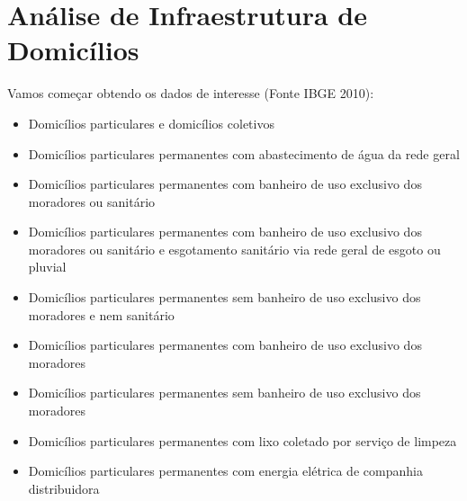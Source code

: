 \documentclass[letterpaper,10pt,brazil]{sphinxmanual}
\begin{document}
\sphinxstepscope


\section{Análise de Infraestrutura de Domicílios}
\label{\detokenize{exemplos/analise_domicilios:An_xe1lise-de-Infraestrutura-de-Domic_xedlios}}\label{\detokenize{exemplos/analise_domicilios::doc}}
\sphinxAtStartPar
Vamos começar obtendo os dados de interesse (Fonte IBGE 2010):
\begin{itemize}
\item {} 
 Domicílios particulares e domicílios coletivos

\item {} 
 Domicílios particulares permanentes com abastecimento de água da rede geral

\item {} 
 Domicílios particulares permanentes com banheiro de uso exclusivo dos moradores ou sanitário

\item {} 
 Domicílios particulares permanentes com banheiro de uso exclusivo dos moradores ou sanitário e esgotamento sanitário via rede geral de esgoto ou pluvial

\item {} 
 Domicílios particulares permanentes sem banheiro de uso exclusivo dos moradores e nem sanitário

\item {} 
 Domicílios particulares permanentes com banheiro de uso exclusivo dos moradores

\item {} 
 Domicílios particulares permanentes sem banheiro de uso exclusivo dos moradores

\item {} 
 Domicílios particulares permanentes com lixo coletado por serviço de limpeza

\item {} 
 Domicílios particulares permanentes com energia elétrica de companhia distribuidora

\end{itemize}
\end{document}
